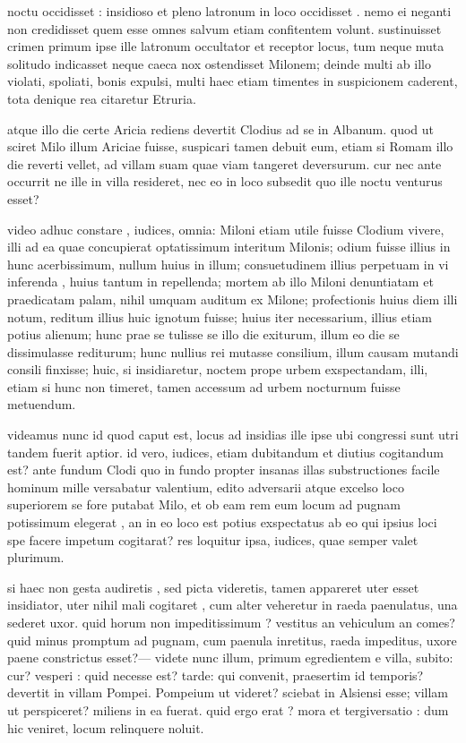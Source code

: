 noctu occidisset : insidioso et pleno latronum in loco occidisset . nemo ei neganti non credidisset quem esse omnes salvum etiam confitentem volunt. sustinuisset crimen primum ipse ille latronum occultator et receptor locus, tum neque muta solitudo indicasset neque caeca nox ostendisset Milonem; deinde multi ab illo violati, spoliati, bonis expulsi, multi haec etiam timentes in suspicionem caderent, tota denique rea citaretur Etruria.

 atque illo die certe Aricia rediens devertit Clodius ad se in Albanum. quod ut sciret Milo illum Ariciae fuisse, suspicari tamen debuit eum, etiam si Romam illo die reverti vellet, ad villam suam quae viam tangeret deversurum. cur nec ante occurrit ne ille in villa resideret, nec eo in loco subsedit quo ille noctu venturus esset?

 video adhuc constare , iudices, omnia: Miloni etiam utile fuisse Clodium vivere, illi ad ea quae concupierat optatissimum interitum Milonis; odium fuisse illius in hunc acerbissimum, nullum huius in illum; consuetudinem illius perpetuam in vi inferenda , huius tantum in repellenda; mortem ab illo Miloni denuntiatam et praedicatam palam, nihil umquam auditum ex Milone; profectionis huius diem illi notum, reditum illius huic ignotum fuisse; huius iter necessarium, illius etiam potius alienum; hunc prae se tulisse se illo die exiturum, illum eo die se dissimulasse rediturum; hunc nullius rei mutasse consilium, illum causam mutandi consili finxisse; huic, si insidiaretur, noctem prope urbem exspectandam, illi, etiam si hunc non timeret, tamen accessum ad urbem nocturnum fuisse metuendum.

 videamus nunc id quod caput est, locus ad insidias ille ipse ubi congressi sunt utri tandem fuerit aptior. id vero, iudices, etiam dubitandum et diutius cogitandum est? ante fundum Clodi quo in fundo propter insanas illas substructiones facile hominum mille versabatur valentium, edito adversarii atque excelso loco superiorem se fore putabat Milo, et ob eam rem eum locum ad pugnam potissimum elegerat , an in eo loco est potius exspectatus ab eo qui ipsius loci spe facere impetum cogitarat? res loquitur ipsa, iudices, quae semper valet plurimum.

 si haec non gesta audiretis , sed picta videretis, tamen appareret uter esset insidiator, uter nihil mali cogitaret , cum alter veheretur in raeda paenulatus, una sederet uxor. quid horum non impeditissimum ? vestitus an vehiculum an comes? quid minus promptum ad pugnam, cum paenula inretitus, raeda impeditus, uxore paene constrictus esset?— videte nunc illum, primum egredientem e villa, subito: cur? vesperi : quid necesse est? tarde: qui convenit, praesertim id temporis? devertit in villam Pompei. Pompeium ut videret? sciebat in Alsiensi esse; villam ut perspiceret? miliens in ea fuerat. quid ergo erat ? mora et tergiversatio : dum hic veniret, locum relinquere noluit.

